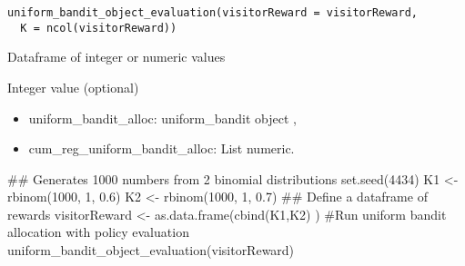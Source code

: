 \documentclass[letterpaper]{book}
\begin{document}
%
\begin{Usage}
\begin{verbatim}
uniform_bandit_object_evaluation(visitorReward = visitorReward,
  K = ncol(visitorReward))
\end{verbatim}
\end{Usage}
%
\begin{Arguments}
\begin{ldescription}
\item[\code{visitorReward}] Dataframe of integer or numeric values

\item[\code{K}] Integer value (optional)
\end{ldescription}
\end{Arguments}
%
\begin{Value}
\begin{itemize}
 List of element:
\item uniform\_bandit\_alloc: uniform\_bandit object ,
\item cum\_reg\_uniform\_bandit\_alloc: List numeric.

\end{itemize}

\end{Value}
%
\begin{Examples}
\begin{ExampleCode}
## Generates 1000 numbers from 2 binomial distributions
set.seed(4434)
K1 <- rbinom(1000, 1, 0.6)
K2 <- rbinom(1000, 1, 0.7)
## Define a dataframe of rewards
visitorReward <- as.data.frame(cbind(K1,K2) )
#Run uniform bandit allocation with policy evaluation
uniform_bandit_object_evaluation(visitorReward)

\end{ExampleCode}
\end{Examples}
\printindex{}
\end{document}
